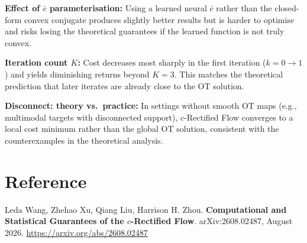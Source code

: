 \documentclass[10pt,twocolumn]{article}
\begin{document}
\textbf{Effect of $\bar{c}$ parameterisation:} Using a learned neural $\bar{c}$
rather than the closed-form convex conjugate produces slightly better results
but is harder to optimise and risks losing the theoretical guarantees if the
learned function is not truly convex.

\textbf{Iteration count $K$:} Cost decreases most sharply in the first iteration
($k = 0 \to 1$) and yields diminishing returns beyond $K = 3$. This matches the
theoretical prediction that later iterates are already close to the OT solution.

\textbf{Disconnect: theory vs.\ practice:} In settings without smooth OT maps
(e.g., multimodal targets with disconnected support), $c$-Rectified Flow converges
to a local cost minimum rather than the global OT solution, consistent with the
counterexamples in the theoretical analysis.

\section*{Reference}

Leda Wang, Zhehao Xu, Qiang Liu, Harrison H. Zhou.
\textbf{Computational and Statistical Guarantees of the $c$-Rectified Flow}.
arXiv:2608.02487, August 2026.
\url{https://arxiv.org/abs/2608.02487}
\end{document}
